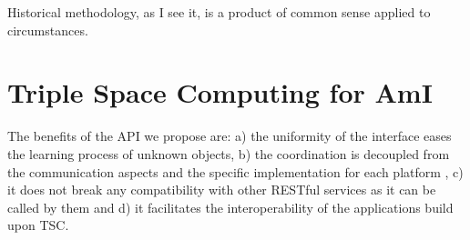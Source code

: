 

\begin{savequote}[50mm]
Historical methodology, as I see it, is a product of common sense applied to circumstances. 
\end{savequote}


\chapter{Triple Space Computing for AmI}
\label{cha:tsc}

\ifpdf
    \graphicspath{{3_overall_methodology/figures/PNG/}{3_overall_methodology/figures/PDF/}{3_overall_methodology/figures/}}
\else
    \graphicspath{{3_overall_methodology/figures/EPS/}{3_overall_methodology/figures/}}
\fi



The benefits of the API we propose are: a) the uniformity of the interface eases the learning process of unknown
objects, b) the coordination is decoupled from the communication aspects and the specific implementation for each
platform \cite{gelernter_coordination_1992}, c) it does not break any compatibility with other RESTful services as it
can be called by them and d) it facilitates the interoperability of the applications build upon TSC.



